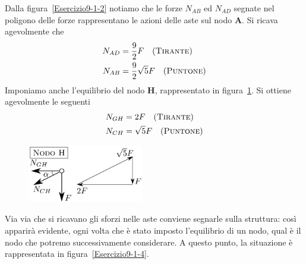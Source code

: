 \noindent Dalla figura~\ref{Esercizio9-1-2} notiamo che le forze $N_{AB}$ ed $N_{AD}$ segnate nel poligono delle forze rappresentano le azioni delle aste sul nodo $\mathbf{A}$. Si ricava agevolmente che
\begin{align*}
N_{AD} &= \frac{9}{2}F \quad (\textup{\textsc{Tirante}}) \\
N_{AB} &= \frac{9}{2}\sqrt{5}F \quad (\textup{\textsc{Puntone}}) 
\end{align*}
Imponiamo anche l'equilibrio del nodo $\mathbf{H}$, rappresentato in figura~\ref{Esercizio9-1-3}. Si ottiene agevolmente le seguenti
\begin{align*}
N_{GH} &= 2F \quad (\textup{\textsc{Tirante}}) \\
N_{CH} &= \sqrt{5}F \quad (\textup{\textsc{Puntone}}) 
\end{align*}
\renewcommand{\thefigure}{9.1~-~3}
\begin{figure}[ht]
\centering
\includegraphics[width=0.45\textwidth]{Immagini/Parte_9/Esercizio9_1/Esercizio9_1_3.pdf}
\caption{}
\label{Esercizio9-1-3}
\end{figure}
Via via che si ricavano gli sforzi nelle aste conviene segnarle sulla struttura: così apparirà evidente, ogni volta che è stato imposto l'equilibrio di un nodo, qual è il nodo che potremo successivamente considerare. A questo punto, la situazione è rappresentata in figura~\ref{Esercizio9-1-4}.
